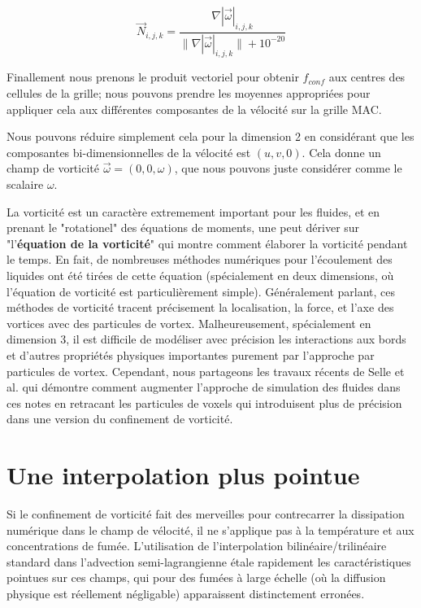 \documentclass[11pt]{report}
\begin{document}
\begin{equation}
\overrightarrow{N}_{i,j,k} = \frac{\nabla |\overrightarrow{\omega}|_{i,j,k}}{\| \nabla |\overrightarrow{\omega}|_{i,j,k} \| + 10^{-20}}
\end{equation}

Finallement nous prenons le produit vectoriel pour obtenir $f_{conf}$ aux centres des cellules de la grille; nous pouvons prendre les moyennes appropriées pour appliquer cela aux différentes composantes de la vélocité sur la grille MAC. \newline

Nous pouvons réduire simplement cela pour la dimension 2 en considérant que les composantes bi-dimensionnelles de la vélocité est $(u,v,0)$. Cela donne un champ de vorticité $\overrightarrow{\omega} = (0,0,\omega)$, que nous pouvons juste considérer comme le scalaire $\omega$. \newline

La vorticité est un caractère extremement important pour les fluides, et en prenant le "rotationel" des équations de moments, une peut dériver sur "l'\textbf{équation de la vorticité}" qui montre comment élaborer la vorticité pendant le temps. En fait, de nombreuses méthodes numériques pour l'écoulement des liquides ont été tirées de cette équation (spécialement en deux dimensions, où l'équation de vorticité est particulièrement simple). Généralement parlant, ces méthodes de vorticité tracent précisement la localisation, la force, et l'axe des vortices avec des particules de vortex. Malheureusement, spécialement en dimension 3, il est difficile de modéliser avec précision les interactions aux bords et d'autres propriétés physiques importantes purement par l'approche par particules de vortex. Cependant, nous partageons les travaux récents de Selle et al. \cite{Selle-2005} qui démontre comment augmenter l'approche de simulation des fluides dans ces notes en retracant les particules de voxels qui introduisent plus de précision dans une version du confinement de vorticité. \newline

\section{Une interpolation plus pointue} 

Si le confinement de vorticité fait des merveilles pour contrecarrer la dissipation numérique dans le champ de vélocité, il ne s'applique pas à la température et aux concentrations de fumée. L'utilisation de l'interpolation bilinéaire/trilinéaire standard  dans l'advection semi-lagrangienne étale rapidement les caractéristiques pointues sur ces champs, qui pour des fumées à large échelle (où la diffusion physique est réellement négligable) apparaissent distinctement erronées.\newline
\end{document}

